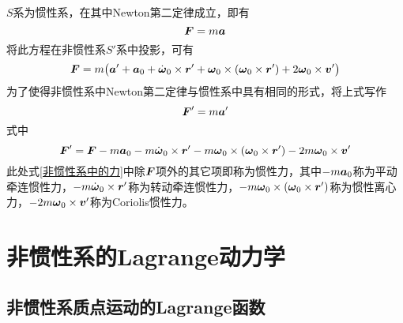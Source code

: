 $S$系为惯性系，在其中Newton第二定律成立，即有
\begin{equation*}
	\boldsymbol{F} = m \boldsymbol{a}
\end{equation*}
将此方程在非惯性系$S'$系中投影，可有
\begin{equation*}
	\boldsymbol{F} = m \big(\boldsymbol{a}' + \boldsymbol{a}_0 + \dot{\boldsymbol{\omega}}_0 \times \boldsymbol{r}' + \boldsymbol{\omega}_0 \times (\boldsymbol{\omega}_0 \times \boldsymbol{r}') + 2\boldsymbol{\omega}_0 \times \boldsymbol{v}'\big)
\end{equation*}
为了使得非惯性系中Newton第二定律与惯性系中具有相同的形式，将上式写作
\begin{equation}
	\boldsymbol{F}' = m \boldsymbol{a}'
\end{equation}
式中
\begin{equation}
	\boldsymbol{F}' = \boldsymbol{F} - m\boldsymbol{a}_0 - m\dot{\boldsymbol{\omega}}_0 \times \boldsymbol{r}' - m\boldsymbol{\omega}_0 \times (\boldsymbol{\omega}_0 \times \boldsymbol{r}') - 2m\boldsymbol{\omega}_0 \times \boldsymbol{v}'
	\label{非惯性系中的力}
\end{equation}
此处式\eqref{非惯性系中的力}中除$\boldsymbol{F}$项外的其它项即称为{\heiti 惯性力}，其中$-m\boldsymbol{a}_0$称为{\heiti 平动牵连惯性力}，$-m\dot{\boldsymbol{\omega}}_0 \times \boldsymbol{r}'$称为{\heiti 转动牵连惯性力}，$-m\boldsymbol{\omega}_0 \times (\boldsymbol{\omega}_0 \times \boldsymbol{r}')$称为{\heiti 惯性离心力}，$-2m\boldsymbol{\omega}_0 \times \boldsymbol{v}'$称为{\heiti Coriolis惯性力}。

\section{非惯性系的Lagrange动力学}

\subsection{非惯性系质点运动的Lagrange函数}

